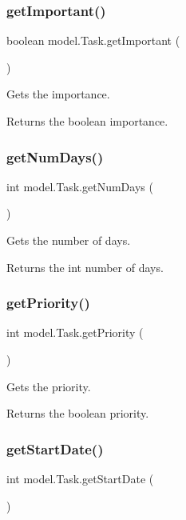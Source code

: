 \subsubsection{get\+Important()}
{\footnotesize\ttfamily boolean model.\+Task.\+get\+Important (\begin{DoxyParamCaption}{ }\end{DoxyParamCaption})}

Gets the importance. \begin{DoxyReturn}{Returns}
the boolean importance. 
\end{DoxyReturn}
\mbox{\label{classmodel_1_1_task_acb151d75bf4e696327fbbabb18033108}} 
\subsubsection{get\+Num\+Days()}
{\footnotesize\ttfamily int model.\+Task.\+get\+Num\+Days (\begin{DoxyParamCaption}{ }\end{DoxyParamCaption})}

Gets the number of days. \begin{DoxyReturn}{Returns}
the int number of days. 
\end{DoxyReturn}
\mbox{\label{classmodel_1_1_task_a3e6030c0c2b09868b157c51642b02483}} 
\subsubsection{get\+Priority()}
{\footnotesize\ttfamily int model.\+Task.\+get\+Priority (\begin{DoxyParamCaption}{ }\end{DoxyParamCaption})}

Gets the priority. \begin{DoxyReturn}{Returns}
the boolean priority. 
\end{DoxyReturn}
\mbox{\label{classmodel_1_1_task_a651d415f333575368f812c47efcac710}} 
\subsubsection{get\+Start\+Date()}
{\footnotesize\ttfamily int model.\+Task.\+get\+Start\+Date (\begin{DoxyParamCaption}{ }\end{DoxyParamCaption})}

